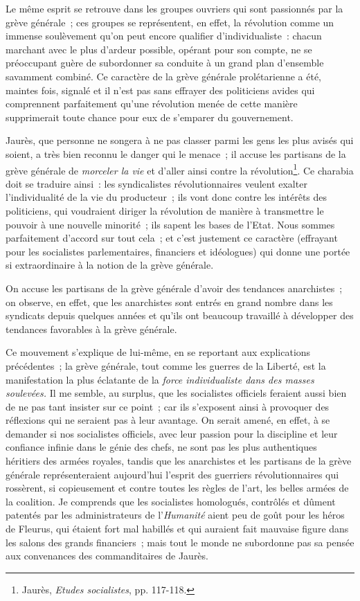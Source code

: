 \documentclass[french,twoside]{book} %
\begin{document}
 Le même esprit se retrouve dans les groupes ouvriers qui sont passionnés par la grève générale ; ces groupes se représentent, en effet, la révolution comme un immense soulèvement qu’on peut encore qualifier d’individualiste : chacun marchant avec le plus d’ardeur possible, opérant pour son compte, ne se préoccupant guère de subordonner sa conduite à un grand plan d’ensemble savamment combiné. Ce caractère de la grève générale prolétarienne a été, maintes fois, signalé et il n’est pas sans effrayer des politiciens avides qui comprennent parfaitement qu’une révolution menée de cette manière supprimerait toute chance pour eux de s’emparer du gouvernement.\par
Jaurès, que personne ne songera à ne pas classer parmi les gens les plus avisés qui soient, a très bien reconnu le danger qui le menace ; il accuse les partisans de la grève générale de \emph{morceler la vie} et d’aller ainsi contre la révolution\footnote{ \noindent Jaurès, \emph{Etudes socialistes}, pp. 117-118.
 }. Ce charabia doit se traduire ainsi : les syndicalistes révolutionnaires veulent exalter l’individualité de la vie du producteur ; ils vont donc contre les intérêts des politiciens, qui voudraient diriger la révolution de manière à transmettre le pouvoir à une nouvelle minorité ; ils sapent les bases de l’Etat. Nous  sommes parfaitement d’accord sur tout cela ; et c’est justement ce caractère (effrayant pour les socialistes parlementaires, financiers et idéologues) qui donne une portée si extraordinaire à la notion de la grève générale.\par
On accuse les partisans de la grève générale d’avoir des tendances anarchistes ; on observe, en effet, que les anarchistes sont entrés en grand nombre dans les syndicats depuis quelques années et qu’ils ont beaucoup travaillé à développer des tendances favorables à la grève générale.\par
Ce mouvement s’explique de lui-même, en se reportant aux explications précédentes ; la grève générale, tout comme les guerres de la Liberté, est la manifestation la plus éclatante de la \emph{force individualiste dans des masses soulevées.} Il me semble, au surplus, que les socialistes officiels feraient aussi bien de ne pas tant insister sur ce point ; car ils s’exposent ainsi à provoquer des réflexions qui ne seraient pas à leur avantage. On serait amené, en effet, à se demander si nos socialistes officiels, avec leur passion pour la discipline et leur confiance infinie dans le génie des chefs, ne sont pas les plus authentiques héritiers des armées royales, tandis que les anarchistes et les partisans de la grève générale représenteraient aujourd’hui l’esprit des guerriers révolutionnaires qui rossèrent, si copieusement et contre toutes les règles de l’art, les belles armées de la coalition. Je comprends que les socialistes homologués, contrôlés et dûment patentés par les administrateurs de l’\emph{Humanité} aient peu de goût pour les héros de Fleurus, qui étaient fort mal habillés et qui auraient fait mauvaise figure dans les salons des grands financiers ; mais tout le monde ne  subordonne pas sa pensée aux convenances des commanditaires de Jaurès.
\end{document}

